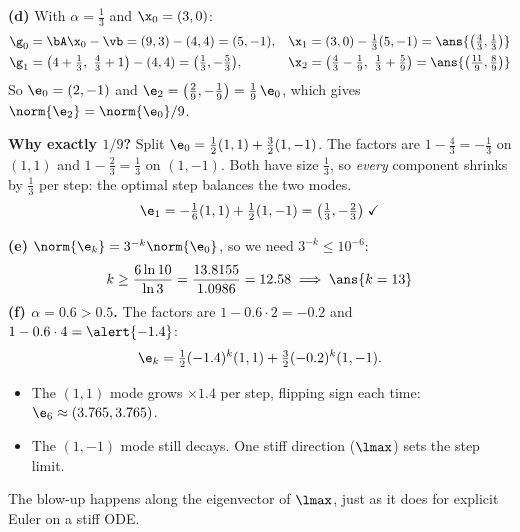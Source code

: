 \begin{frame}{}
  \textbf{(d)} With $\alpha = \tfrac13$ and $\x_0 = (3,0)$:
  \begin{align*}
    \g_0 &= \bA\x_0 - \vb = (9,3) - (4,4) = (5,-1), &
    \x_1 &= (3,0) - \tfrac13(5,-1) = \ans{\bigl(\tfrac43,\tfrac13\bigr)}\\
    \g_1 &= \bigl(4+\tfrac13,\ \tfrac43+1\bigr) - (4,4) = \bigl(\tfrac13,-\tfrac53\bigr), &
    \x_2 &= \bigl(\tfrac43-\tfrac19,\ \tfrac13+\tfrac59\bigr) = \ans{\bigl(\tfrac{11}9,\tfrac89\bigr)}
  \end{align*}
  So $\e_0 = (2,-1)$ and $\e_2 = \bigl(\tfrac29,-\tfrac19\bigr) = \tfrac19\,\e_0$, which gives $\norm{\e_2} = \norm{\e_0}/9$. \checkmark

  \vspace{4pt}
  \textbf{Why exactly $1/9$?} Split $\e_0 = \tfrac12(1,1) + \tfrac32(1,-1)$. The factors are
  $1-\tfrac43 = -\tfrac13$ on $(1,1)$ and $1-\tfrac23 = \tfrac13$ on $(1,-1)$. Both have size $\tfrac13$,
  so \emph{every} component shrinks by $\tfrac13$ per step: the optimal step \alert{balances} the two modes.
  \[
    \e_1 = -\tfrac16(1,1) + \tfrac12(1,-1) = \bigl(\tfrac13,-\tfrac23\bigr) \;\checkmark
  \]
\end{frame}

\begin{frame}{}
  \textbf{(e)} $\norm{\e_k} = 3^{-k}\norm{\e_0}$, so we need $3^{-k} \le 10^{-6}$:
  \vspace{-4pt}
  \[
    k \ge \frac{6\ln 10}{\ln 3} = \frac{13.8155}{1.0986} = 12.58
    \;\Longrightarrow\; \ans{k = 13}
  \]
  \textbf{(f) $\alpha = 0.6 > 0.5$.} The factors are $1 - 0.6\cdot2 = -0.2$ and $1 - 0.6\cdot4 = \alert{-1.4}$:
  \[
    \e_k = \tfrac12(-1.4)^k(1,1) + \tfrac32(-0.2)^k(1,-1).
  \]
  \begin{itemize}\small
    \item The $(1,1)$ mode \alert{grows} $\times1.4$ per step, flipping sign each time: $\e_6 \approx (3.765, 3.765)$.
    \item The $(1,-1)$ mode still decays. One stiff direction ($\lmax$) sets the step limit.
  \end{itemize}
  \begin{keybox}[Lesson]
    The blow-up happens along the eigenvector of $\lmax$, just as it does for explicit Euler on a stiff ODE.
  \end{keybox}
\end{frame}
